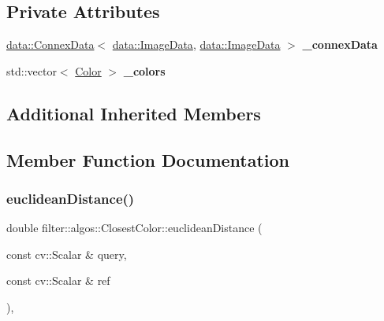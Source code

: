 \subsection*{Private Attributes}
\begin{DoxyCompactItemize}
\item 
\mbox{\label{classfilter_1_1algos_1_1_closest_color_adb799d7963f46519cddc77a0c26f3194}} 
\hyperlink{classfilter_1_1data_1_1_connex_data}{data\+::\+Connex\+Data}$<$ \hyperlink{classfilter_1_1data_1_1_image_data}{data\+::\+Image\+Data}, \hyperlink{classfilter_1_1data_1_1_image_data}{data\+::\+Image\+Data} $>$ {\bfseries \+\_\+connex\+Data}
\item 
\mbox{\label{classfilter_1_1algos_1_1_closest_color_a53824a9cc08556a65946c15cd60a55a0}} 
std\+::vector$<$ \hyperlink{structfilter_1_1algos_1_1_closest_color_1_1_color}{Color} $>$ {\bfseries \+\_\+colors}
\end{DoxyCompactItemize}
\subsection*{Additional Inherited Members}


\subsection{Member Function Documentation}
\mbox{\label{classfilter_1_1algos_1_1_closest_color_ac89955e42d78860343ab1c13b6458ec7}} 
\subsubsection{\texorpdfstring{euclidean\+Distance()}{euclideanDistance()}}
{\footnotesize\ttfamily double filter\+::algos\+::\+Closest\+Color\+::euclidean\+Distance (\begin{DoxyParamCaption}\item[{const cv\+::\+Scalar \&}]{query,  }\item[{const cv\+::\+Scalar \&}]{ref }\end{DoxyParamCaption})\hspace{0.3cm}{\ttfamily [inline]}, {\ttfamily [private]}}


